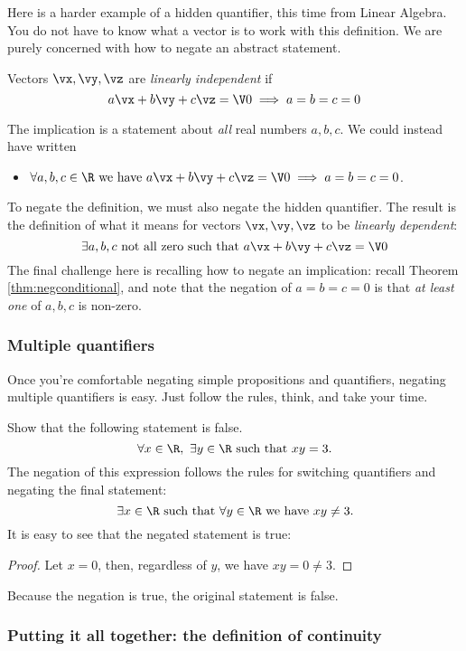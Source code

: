 \noindent Here is a harder example of a hidden quantifier, this time from Linear Algebra. You do not have to know what a vector is to work with this definition. We are purely concerned with how to negate an abstract statement.

\begin{defn}
Vectors $\vx,\vy,\vz$ are \emph{linearly independent} if
\[a\vx+b\vy+c\vz=\V 0\implies a=b=c=0\]
\end{defn}
The implication is a statement about \emph{all} real numbers $a,b,c$. We could instead have written
  \begin{itemize}\setlength{\itemsep}{0pt}
    \item[] $\forall a,b,c\in\R\text{ we have }a\vx+b\vy+c\vz=\V 0\implies a=b=c=0$.
  \end{itemize}
  To negate the definition, we must also negate the hidden quantifier. The result is the definition of what it means for vectors $\vx,\vy,\vz$ to be \emph{linearly dependent}:
    \[\exists a,b,c\text{ not all zero such that }a\vx+b\vy+c\vz=\V 0\]
The final challenge here is recalling how to negate an implication: recall Theorem \ref{thm:negconditional}, and note that the negation of $a=b=c=0$ is that \emph{at least one} of $a,b,c$ is non-zero.

\subsubsection*{Multiple quantifiers}

Once you're comfortable negating simple propositions and quantifiers, negating multiple quantifiers is easy. Just follow the rules, think, and take your time.

\begin{example}
Show that the following statement is false.
\[\forall x\in\R,\ \exists y\in\R\text{ such that }xy=3.\]
The negation of this expression follows the rules for switching quantifiers and negating the final statement:
\[\exists x\in\R\text{ such that }\forall y\in\R\text{ we have }xy\neq 3.\]
It is easy to see that the negated statement is true:
\begin{proof}
Let $x=0$, then, regardless of $y$, we have $xy=0\neq 3$.
\end{proof}

\noindent Because the negation is true, the original statement is false.
\end{example}


\subsubsection*{Putting it all together: the definition of continuity}

